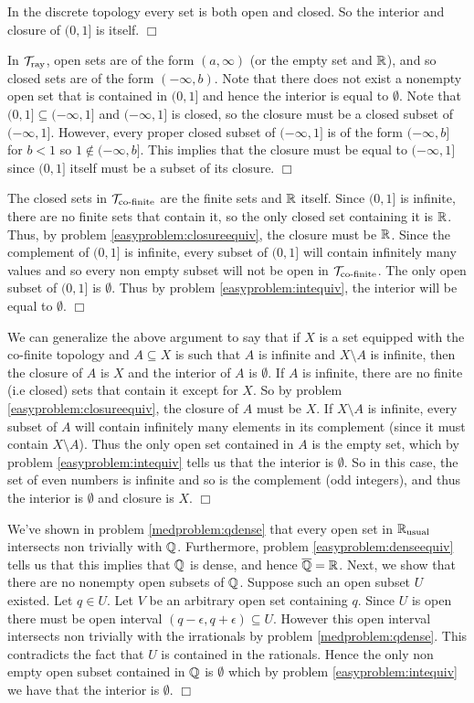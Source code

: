\documentclass{article}
\begin{document}
{\begin{spacedenumerate}
    \item In the discrete topology every set is both open and closed. So the interior and closure of $(0,1]$ is itself. $\Box$
    \item In $\mathcal{T}_{\text{ray}}$, open sets are of the form $(a, \infty)$ (or the empty set and $\mathbb{R}$), and so closed sets are of the form $(-\infty, b)$. Note that there does not exist a nonempty open set that is contained in $(0,1]$ and hence the interior is equal to $\emptyset$. Note that $(0,1]\subseteq (-\infty, 1]$ and $(-\infty, 1]$ is closed, so the closure must be a closed subset of $(-\infty,1]$. However, every proper closed subset of $(-\infty,1]$ is of the form $(-\infty,b]$ for $b <  1$ so $1\not\in(-\infty,b]$. This implies that the closure must be equal to $(-\infty, 1]$ since $(0,1]$ itself must be a subset of its closure. $\Box$
    \item The closed sets in $\mathcal{T}_{\text{co-finite}}$ are the finite sets and $\mathbb{R}$ itself. Since $(0,1]$ is infinite, there are no finite sets that contain it, so the only closed set containing it is $\mathbb{R}$. Thus, by problem \ref{easyproblem:closureequiv}, the closure must be $\mathbb{R}$. Since the complement of $(0,1]$ is infinite, every subset of $(0,1]$ will contain infinitely many values and so every non empty subset will not be open in $\mathcal{T}_{\text{co-finite}}$. The only open subset of $(0,1]$ is $\emptyset$. Thus by problem \ref{easyproblem:intequiv}, the interior will be equal to $\emptyset$. $\Box$
    \item We can generalize the above argument to say that if $X$ is a set equipped with the co-finite topology and $A\subseteq X$ is such that $A$ is infinite and $X\setminus A$ is infinite, then the closure of $A$ is $X$ and the interior of $A$ is $\emptyset$. If $A$ is infinite, there are no finite (i.e closed) sets that contain it except for $X$. So by problem \ref{easyproblem:closureequiv}, the closure of $A$ must be $X$. If $X\setminus A$ is infinite, every subset of $A$ will contain infinitely many elements in its complement (since it must contain $X\setminus A$). Thus the only open set contained in $A$ is the empty set, which by problem \ref{easyproblem:intequiv} tells us that the interior is $\emptyset$. So in this case, the set of even numbers is infinite and so is the complement (odd integers), and thus the interior is $\emptyset$ and closure is $X$. $\Box$
    \item We've shown in problem \ref{medproblem:qdense} that every open set in $\mathbb{R}_{\text{usual}}$ intersects non trivially with $\mathbb{Q}$. Furthermore, problem \ref{easyproblem:denseequiv} tells us that this implies that $\mathbb{Q}$ is dense, and hence $\overline{\mathbb{Q}} = \mathbb{R}$. Next, we show that there are no nonempty open subsets of $\mathbb{Q}$. Suppose such an open subset $U$ existed. Let $q\in U$. Let $V$ be an arbitrary open set  containing $q$. Since $U$ is open there must be open interval $(q-\epsilon, q + \epsilon)\subseteq U$. However this open interval intersects non trivially with the irrationals by problem \ref{medproblem:qdense}. This contradicts the fact that $U$ is contained in the rationals. Hence the only non empty open subset contained in $\mathbb{Q}$ is $\emptyset$ which by problem \ref{easyproblem:intequiv} we have that the interior is $\emptyset$. $\Box$

\end{spacedenumerate}}
\end{document}
